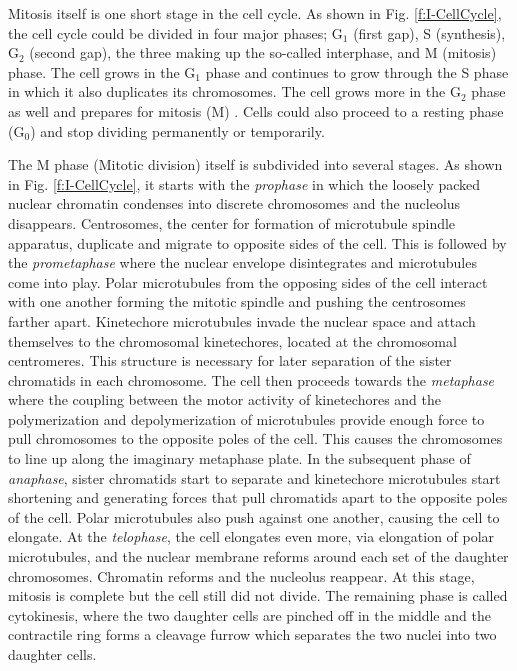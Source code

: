 \documentclass[11pt]{report}
\begin{document}
Mitosis itself is one short stage in the cell cycle. 
As shown in 
Fig. \ref{f:I-CellCycle}, the cell cycle could be divided in
four major phases; G$_{1}$ (first gap), S (synthesis), G$_{2}$
(second gap), the three making up the so-called interphase, and
M (mitosis) phase. The cell grows in the G$_{1}$ phase and continues
to grow through the S phase in which it also duplicates its
chromosomes. The cell grows more in the G$_{2}$ phase as well
and prepares for mitosis (M) \cite{Blow2005}. Cells could also proceed
to a resting phase (G$_{0}$) and stop dividing permanently or
temporarily.

The M phase (Mitotic division) itself is subdivided into several
stages. As shown in 
Fig. \ref{f:I-CellCycle}, it starts with the \emph{prophase} in which the loosely packed
nuclear chromatin condenses into discrete chromosomes and the 
nucleolus disappears. Centrosomes, the center for
formation of microtubule spindle apparatus, duplicate and
migrate to opposite sides of the cell.
This is followed by the \emph{prometaphase} where the nuclear
envelope disintegrates and microtubules come into play.
Polar microtubules from the opposing sides of the cell interact
with one another forming the mitotic spindle and pushing
the centrosomes farther apart. Kinetechore microtubules invade
the nuclear space and attach themselves to the chromosomal 
kinetechores, located at the chromosomal centromeres. This
structure is necessary for later separation of the sister chromatids
in each chromosome. The cell then proceeds towards the \emph{metaphase} where the coupling between 
the motor activity of kinetechores  and the polymerization 
and depolymerization of microtubules
provide enough force to pull chromosomes to the opposite 
poles of the cell. This causes the chromosomes to line up
along the imaginary metaphase plate. In the subsequent phase of
\emph{anaphase}, sister chromatids start to separate and
kinetechore microtubules start shortening and generating forces
that pull chromatids apart to the opposite poles of the cell.
Polar microtubules also push against one another, causing the cell to elongate. At the \emph{telophase}, the cell
elongates even more, via elongation of polar microtubules,
and the nuclear membrane reforms around each set of the daughter
chromosomes. Chromatin reforms and the nucleolus reappear. At this
stage, mitosis is complete but the cell still did not divide. The
remaining phase is called cytokinesis, where the two daughter
cells are pinched off in the middle and the contractile
ring forms a cleavage furrow which separates the two nuclei
into two daughter cells.
\end{document}
